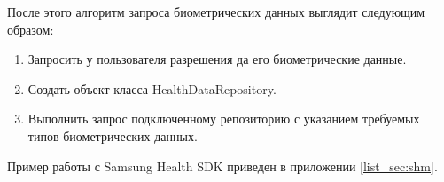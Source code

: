 После этого алгоритм запроса биометрических данных выглядит следующим образом:
\begin{enumerate}
	\item Запросить у пользователя разрешения да его биометрические данные.
	\item Создать объект класса HealthDataRepository.
	\item Выполнить запрос подключенному репозиторию с указанием требуемых типов биометрических данных.
\end{enumerate}
\smallskip
Пример работы с Samsung Health SDK приведен в приложении \ref{list_sec:shm}.